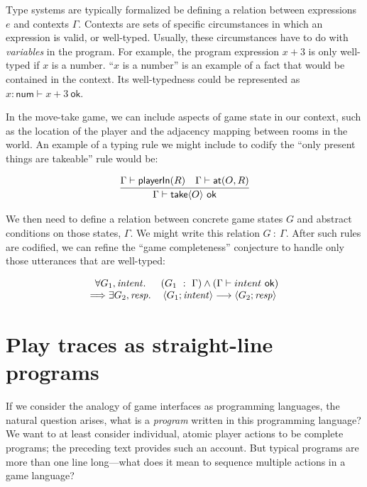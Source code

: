   Type systems are typically formalized be defining a relation between
  expressions $e$ and contexts $\Gamma$. Contexts are sets of specific
  circumstances in which an expression is valid, or well-typed. Usually,
  these circumstances have to do with {\em variables} in the program. For
  example, the program expression $x+3$ is only well-typed if $x$ is
  a number. ``$x$ is a number'' is an example of a fact that would be
  contained in the context. Its well-typedness could be represented as
  $x{:}\mathsf{num} \vdash x+3{\ \mathsf{ok}}$.
  
  In the move-take game, we can include aspects of game state in our
  context, such as the location of the player and the adjacency mapping
  between rooms in the world. An example of a typing rule we might include
  to codify the ``only present things are takeable'' rule would be:

  \[
    \infer
    { 
      \Gamma \vdash \ctake\param{O}\ \syn{ok}
    }
    {
      \Gamma \vdash \syn{playerIn}(R)
      \quad
      \Gamma \vdash \syn{at}(O, R)
    }
  \]

  We then need to define a relation between concrete game states $G$ and
  abstract conditions on those states, $\Gamma$. We might write this
  relation $G\ :\ \Gamma$.
  After such rules are codified, we can refine the ``game completeness''
  conjecture to handle only those utterances that are well-typed:

  \[
  \begin{array}{cc}
  \forall G_1, \mathit{intent}.
  & (G_1\ :\ \Gamma)
    \land
    (\Gamma \vdash intent\ \mathsf{ok})
  \\
\Longrightarrow
  \exists G_2, \mathit{resp}.
  &\left< G_1; \mathit{intent} \right> \longrightarrow \left< G_2; \mathit{resp} \right>
  \end{array}
  \]
  

  \section{Play traces as straight-line programs}
  

    If we consider the analogy of game interfaces as programming languages,
    the natural question arises, what is a {\em program} written in this
    programming language? We want to at least consider individual, atomic
    player actions to be complete programs; the preceding text provides
    such an account. But typical programs are more than one line
    long---what does it mean to sequence multiple actions in a game
    language?

